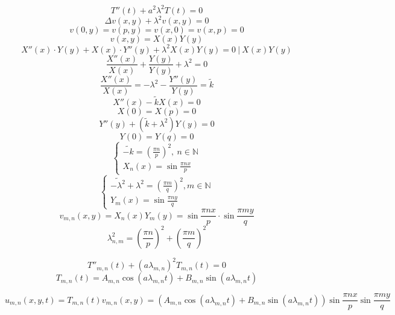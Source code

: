 \documentclass[a4paper]{article}
\begin{document}
\[
    T''(t) + a^2 \lambda^2 T(t) = 0
\]
\[
    \Delta v(x,y) + \lambda^2 v(x,y) = 0
\]
\[
    v(0,y) = v(p,y) = v(x,0) = v(x,p) = 0
\]
\begin{equation}
    v(x,y) = X(x) Y(y)
    \label{eq:9}
\end{equation}
\[
    X''(x) \cdot Y(y) + X(x) \cdot Y''(y) + \lambda^2 X(x) Y(y) = 0 \ | \ X(x) Y(y)
\]
\[
    \frac{X''(x)}{X(x)} + \frac{Y(y)}{Y(y)} + \lambda^2 = 0
\]
\[
    \frac{X''(x)}{X(x)} = -\lambda^2 - \frac{Y''(y)}{Y(y)} = \widetilde{k}
\]
\[
    X''(x) - \widetilde{k} X(x) = 0
\]
\[
    X(0) = X(p) = 0
\]
\[
    Y''(y) + (\widetilde{k} + \lambda^2) Y(y) = 0
\]
\[
    Y(0) = Y(q) = 0
\]
\[
    \begin{cases}
        \widetilde{-k} = \left( \frac{\pi n}{p} \right)^2, \ n \in \mathbb{N}\\
        X_n(x) = \sin \frac{\pi nx}{p} 
    \end{cases}
\]
\[
    \begin{cases}
        \widetilde{-\lambda^2} + \lambda^2 = \left( \frac{\pi m}{q} \right)^2, m \in \mathbb{N}\\
        Y_m(x) = \sin \frac{\pi ny}{q} 
    \end{cases}
\]
\begin{equation}
    v_{m,n}(x,y) = X_n(x) Y_m(y) = \sin \frac{\pi nx}{p} \cdot \sin \frac{\pi my}{q}  
\end{equation}
\begin{equation}
    \lambda_{n,m}^2 = \left(\frac{\pi n}{p}\right)^2 + \left( \frac{\pi m}{q} \right)^2 
\end{equation}

\[
    T''_{m,n}(t) + (a\lambda_{m,n})^2 T_{m,n}(t) = 0
\]
\begin{equation}
    T_{m,n}(t) = A_{m,n} \cos(a \lambda_{m,n} t) + B_{m,n} \sin(a \lambda_{m,n} t)
\end{equation}

\[
    u_{m,n}(x,y,t) = T_{m,n}(t) v_{m,n}(x,y) = 
    (A_{m,n} \cos(a \lambda_{m,n} t) + B_{m,n} \sin(a \lambda_{m,n} t))
    \sin \frac{\pi nx}{p} \sin \frac{\pi my}{q} 
\]
\end{document}
